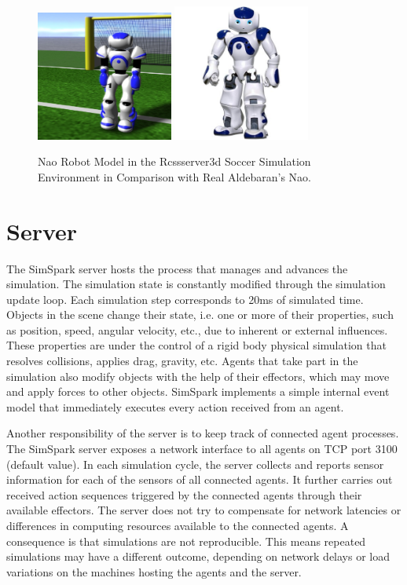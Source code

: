 \begin{figure}[t!]
\centering
  \includegraphics[trim=7cm 0cm 0cm 0cm, clip, width=0.4\textwidth]{Chapter2/figures/629px-Models-nao.jpg}
  \includegraphics[width=0.4\textwidth]{Chapter2/figures/RealNao.jpg}
  \caption{Nao Robot Model in the Rcssserver3d Soccer Simulation Environment in Comparison with Real Aldebaran's Nao.} 
  \label{fig:Naoinsimulationscreen}
\end{figure}

\section{Server}
The SimSpark server hosts the process that manages and advances the simulation. The simulation state is constantly modified through the simulation update loop. Each simulation step corresponds to 20ms of simulated time. Objects in the scene change their state, i.e. one or more of their properties, such as position, speed, angular velocity, etc., due to inherent or external influences. These properties are under the control of a rigid body physical simulation that resolves collisions, applies drag, gravity, etc. Agents that take part in the simulation also modify objects with the help of their effectors, which may move and apply forces to other objects. SimSpark implements a simple internal event model that immediately executes every action received from an agent.


Another responsibility of the server is to keep track of connected agent processes. The SimSpark server exposes a network interface to all agents on TCP port 3100 (default value). In each simulation cycle, the server collects and reports sensor information for each of the sensors of all connected agents. It further carries out received action sequences triggered by the connected agents through their available effectors.
The server does not try to compensate for network latencies or differences in computing resources available to the connected agents. A consequence is that simulations are not reproducible. This means repeated simulations may have a different outcome, depending on network delays or load variations on the machines hosting the agents and the server.


